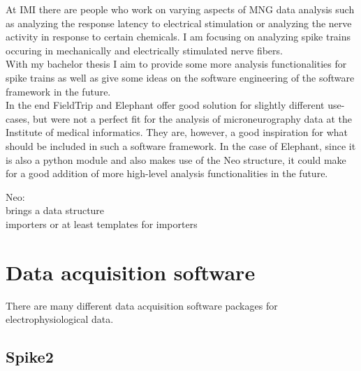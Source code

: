 At IMI there are people who work on varying aspects of MNG data analysis such as analyzing the response latency to electrical stimulation or analyzing the nerve activity in response to certain chemicals. I am focusing on analyzing spike trains occuring in mechanically and electrically stimulated nerve fibers.\\
With my bachelor thesis I aim to provide some more analysis functionalities for spike trains as well as give some ideas on the software engineering of the software framework in the future.\\
In the end FieldTrip and Elephant offer good solution for slightly different use-cases, but were not a perfect fit for the analysis of microneurography data at the Institute of medical informatics. They are, however, a good inspiration for what should be included in such a software framework. In the case of Elephant, since it is also a python module and also makes use of the Neo structure, it could make for a good addition of more high-level analysis functionalities in the future.



Neo:\\
brings a data structure\\
importers or at least templates for importers



\section{Data acquisition software} 
There are many different data acquisition software packages for electrophysiological data. 

\subsection{Spike2}

